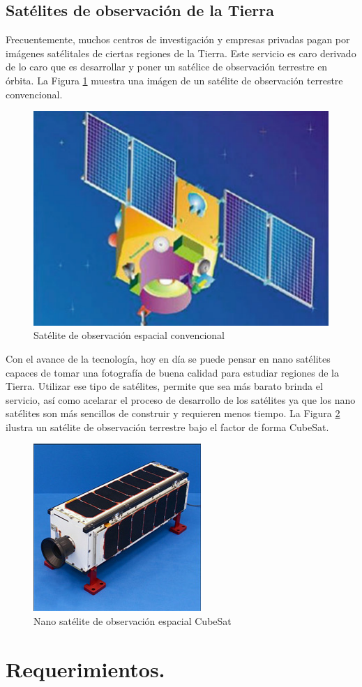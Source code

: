\documentclass{article}%
\begin{document}
\subsection{Satélites de observación de la Tierra}
\justify
Frecuentemente, muchos centros de investigación y empresas privadas pagan por imágenes satélitales de ciertas regiones de 
la Tierra. Este servicio es caro derivado de lo caro que es desarrollar y poner un satélice de observación terrestre en órbita.
La Figura \ref{figure:BigCamSat} muestra una imágen de un satélite de observación terrestre convencional.
\clearpage
\begin{figure}[!h]
  \centering
  \includegraphics[width=0.5\linewidth]{img/SatCam.png}
  \caption{Satélite de observación espacial convencional}
  \label{figure:BigCamSat}
\end{figure}
\justify
Con el avance de la tecnología, hoy en día se puede pensar en nano satélites capaces de tomar una fotografía de buena calidad 
para estudiar regiones de la Tierra. Utilizar ese tipo de satélites, permite que sea más barato brinda el servicio, así como 
acelarar el proceso de desarrollo de los satélites ya que los nano satélites son más sencillos de construir y requieren 
menos tiempo. La Figura \ref{figure:CamSat} ilustra un satélite de observación terrestre bajo el factor de forma CubeSat.
\begin{figure}[!h]
  \centering
  \includegraphics[width=0.3\linewidth]{img/camcubesat.jgp.jpg}
  \caption{Nano satélite de observación espacial CubeSat}
  \label{figure:CamSat}
\end{figure}
\section{Requerimientos.}
\end{document}
